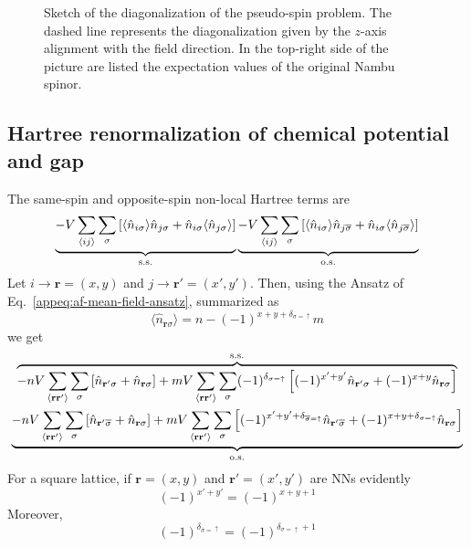 \begin{figure}
	\centering
	
	\caption{Sketch of the diagonalization of the pseudo-spin problem. The dashed line represents the diagonalization given by the $z$-axis alignment with the field direction. In the top-right side of the picture are listed the expectation values of the original Nambu spinor.}
	\label{fig:pseudo-magnetic-field}
\end{figure}

\subsection{Hartree renormalization of chemical potential and gap}

The same-spin and opposite-spin non-local Hartree terms are
\[
	\underbrace{
		-V \sum_{\ev{ij}} \sum_\sigma \left[
			\langle 
				\hat n_{i\sigma}
			\rangle \hat n_{j\sigma} + \hat n_{i\sigma} \langle 
				\hat n_{j\sigma}
			\rangle
		\right]
	}_{\mathrm{s.s.}}
	\underbrace{
		-V \sum_{\ev{ij}} \sum_\sigma \left[
			\langle
				\hat n_{i\sigma}
			\rangle \hat n_{j\overline{\sigma}} + \hat n_{i\sigma} \langle 
				\hat n_{j\overline{\sigma}}
			\rangle
		\right]
	}_{\mathrm{o.s.}}
\]
Let $i \to \mathbf{r} = (x,y)$ and $j \to \mathbf{r}' = (x',y')$. Then, using the Ansatz of Eq.~\ref{appeq:af-mean-field-ansatz}, summarized as
\[
	\langle \hat n_{\mathbf{r}\sigma} \rangle = n - (-1)^{x+y+\delta_{\sigma=\uparrow}} m
\]
we get
\begin{multline*}
	\overbrace{
		-nV \sum_{\ev{\mathbf{r}\mathbf{r}'}} \sum_\sigma \left[
			\hat n_{\mathbf{r}'\sigma} + \hat n_{\mathbf{r}\sigma}
		\right] + mV \sum_{\ev{\mathbf{r}\mathbf{r}'}} \sum_\sigma (-1)^{\delta_{\sigma=\uparrow}} \left[
			(-1)^{x'+y'} \hat n_{\mathbf{r}'\sigma} + (-1)^{x+y} \hat n_{\mathbf{r}\sigma}
		\right]
	}^{\mathrm{s.s.}} \\
	\underbrace{
		-nV \sum_{\ev{\mathbf{r}\mathbf{r}'}} \sum_\sigma \left[
			\hat n_{\mathbf{r}'\overline{\sigma}} + \hat n_{\mathbf{r}\sigma}
		\right] + mV \sum_{\ev{\mathbf{r}\mathbf{r}'}} \sum_\sigma \left[
			(-1)^{x'+y'+\delta_{\overline{\sigma}=\uparrow}} \hat n_{\mathbf{r}'\overline{\sigma}} + (-1)^{x+y+\delta_{\sigma=\uparrow}} \hat n_{\mathbf{r}\sigma}
		\right]
	}_{\mathrm{o.s.}}
\end{multline*}
For a square lattice, if $\mathbf{r} = (x,y)$ and $\mathbf{r}' = (x',y')$ are NNs evidently
\[
	(-1)^{x'+y'} = (-1)^{x+y+1}
\]
Moreover,
\[
	(-1)^{\delta_{\overline{\sigma}=\uparrow}} = (-1)^{\delta_{\sigma=\uparrow}+1}
\]
